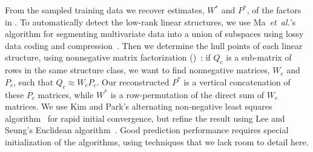 \documentclass{acm_proc_article-sp}
\begin{document}

From the sampled training data we recover estimates, $W^*$ and $P^*$, of the factors in .
To automatically detect the low-rank linear structures, we use Ma~\emph{et~al.}'s algorithm for segmenting multivariate data into a union of subspaces using lossy data coding and compression~\cite{Ma07}.
Then we determine the hull points of each linear structure, using nonnegative matrix factorization ()~\cite{Lee01,Kim08:anls}:
if $Q_c$ is a sub-matrix of rows in the same structure class, we want to find nonnegative matrices, $W_c$ and $P_c$, such that $Q_c \approx W_c P_c$.
Our reconstructed $P^*$ is a vertical concatenation of these $P_c$ matrices, while $W^*$ is a row-permutation of the direct sum of $W_c$ matrices.
We use Kim and Park's alternating non-negative least squares algorithm~\cite{Kim08:anls} for rapid initial convergence, but refine the result using Lee and Seung's Euclidean algorithm~\cite{Lee01}.
Good prediction performance requires special initialization of the  algorithms, using techniques that we lack room to detail here.
\end{document}
